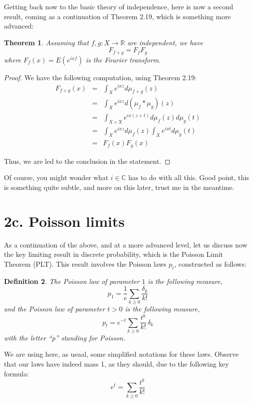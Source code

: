 \documentclass[12pt]{amsbook}
\newtheorem{theorem}{Theorem}[chapter]
\newtheorem{definition}[theorem]{Definition}
\begin{document}
Getting back now to the basic theory of independence, here is now a second result, coming as a continuation of Theorem 2.19, which is something more advanced:


\begin{theorem}
Assuming that $f,g:X\to\mathbb R$ are independent, we have
$$F_{f+g}=F_fF_g$$
where $F_f(x)=E(e^{ixf})$ is the Fourier transform.
\end{theorem}

\begin{proof}
We have the following computation, using Theorem 2.19:
\begin{eqnarray*}
F_{f+g}(x)
&=&\int_Xe^{ixz}d\mu_{f+g}(z)\\
&=&\int_Xe^{ixz}d(\mu_f*\mu_g)(z)\\
&=&\int_{X\times X}e^{ix(z+t)}d\mu_f(z)d\mu_g(t)\\
&=&\int_Xe^{ixz}d\mu_f(z)\int_Xe^{ixt}d\mu_g(t)\\
&=&F_f(x)F_g(x)
\end{eqnarray*}

Thus, we are led to the conclusion in the statement.
\end{proof}

Of course, you might wonder what $i\in\mathbb C$ has to do with all this. Good point, this is something quite subtle, and more on this later, trust me in the meantime.

\section*{2c. Poisson limits}

As a continuation of the above, and at a more advanced level, let us discuss now the key limiting result in discrete probability, which is the Poisson Limit Theorem (PLT). This result involves the Poisson laws $p_t$, constructed as follows:


\begin{definition}
The Poisson law of parameter $1$ is the following measure,
$$p_1=\frac{1}{e}\sum_{k\geq0}\frac{\delta_k}{k!}$$
and the Poisson law of parameter $t>0$ is the following measure,
$$p_t=e^{-t}\sum_{k\geq0}\frac{t^k}{k!}\,\delta_k$$
with the letter ``p'' standing for Poisson.
\end{definition}

We are using here, as usual, some simplified notations for these laws. Observe that our laws have indeed mass 1, as they should, due to the following key formula:
$$e^t=\sum_{k\geq0}\frac{t^k}{k!}$$
\end{document}
